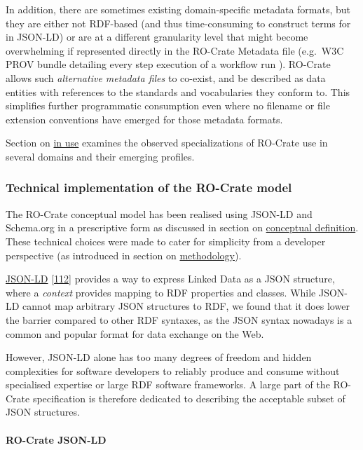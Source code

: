 {In addition, there are sometimes existing domain-specific metadata
formats, but they are either not RDF-based (and thus time-consuming to
construct terms for in JSON-LD) or are at a different granularity level
that might become overwhelming if represented directly in the RO-Crate
Metadata file (e.g.~W3C PROV bundle detailing every step execution of a
workflow run
\cite{ch5-68}). RO-Crate
allows such \emph{alternative metadata files} to co-exist, and be
described as data entities with references to the standards and
vocabularies they conform to. This simplifies further programmatic
consumption even where no filename or file extension conventions have
emerged for those metadata formats.

Section on \protect\hyperlink{inuse}{in use} examines the observed
specializations of RO-Crate use in several domains and their emerging
profiles.

\hypertarget{implementation}{%
\subsubsection{Technical implementation of the RO-Crate
model}\label{implementation}}

The RO-Crate conceptual model has been realised using JSON-LD and
Schema.org in a prescriptive form as discussed in section on
\protect\hyperlink{conceptual}{conceptual definition}. These technical
choices were made to cater for simplicity from a developer perspective
(as introduced in section on
\protect\hyperlink{methodology}{methodology}).

\href{https://json-ld.org/}{JSON-LD}
\href{https://www.w3.org/TR/2014/REC-json-ld-20140116/}{{[}112{]}}
provides a way to express Linked Data as a JSON structure, where a
\emph{context} provides mapping to RDF properties and classes. While
JSON-LD cannot map arbitrary JSON structures to RDF, we found that it
does lower the barrier compared to other RDF syntaxes, as the JSON
syntax nowadays is a common and popular format for data exchange on the
Web.

However, JSON-LD alone has too many degrees of freedom and hidden
complexities for software developers to reliably produce and consume
without specialised expertise or large RDF software frameworks. A large
part of the RO-Crate specification is therefore dedicated to describing
the acceptable subset of JSON structures.

\hypertarget{jsonld}{%
\paragraph{RO-Crate JSON-LD}\label{jsonld}}

}
